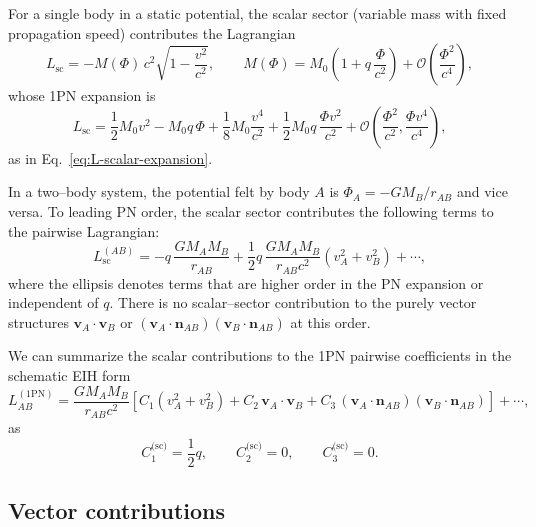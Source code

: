 \documentclass[11pt]{article}
\begin{document}
For a single body in a static potential, the scalar sector (variable mass
with fixed propagation speed) contributes the Lagrangian
\begin{equation}
  L_{\text{sc}}
  = -M(\Phi)\,c^2 \sqrt{1 - \frac{v^2}{c^2}},
  \qquad
  M(\Phi) = M_0 \left( 1 + q\,\frac{\Phi}{c^2} \right)
  + \mathcal{O}\!\left( \frac{\Phi^2}{c^4} \right),
\end{equation}
whose 1PN expansion is
\begin{equation}
  L_{\text{sc}}
  = \frac{1}{2} M_0 v^2
    - M_0 q\,\Phi
    + \frac{1}{8} M_0 \frac{v^4}{c^2}
    + \frac{1}{2} M_0 q\,\frac{\Phi v^2}{c^2}
    + \mathcal{O}\!\left( \frac{\Phi^2}{c^2}, \frac{\Phi v^4}{c^4} \right),
\end{equation}
as in Eq.~\eqref{eq:L-scalar-expansion}.

In a two--body system, the potential felt by body \(A\) is
\(\Phi_A = -G M_B / r_{AB}\) and vice versa.  To leading PN order, the
scalar sector contributes the following terms to the pairwise Lagrangian:
\begin{equation}
  L_{\text{sc}}^{(AB)}
  = - q \,\frac{G M_A M_B}{r_{AB}}
    + \frac{1}{2} q \,\frac{G M_A M_B}{r_{AB} c^2}
      \left( v_A^2 + v_B^2 \right)
    + \cdots,
  \label{eq:L-sc-AB}
\end{equation}
where the ellipsis denotes terms that are higher order in the PN expansion
or independent of \(q\).  There is no scalar--sector contribution to the
purely vector structures \(\mathbf{v}_A \cdot \mathbf{v}_B\) or
\((\mathbf{v}_A \cdot \mathbf{n}_{AB})
 (\mathbf{v}_B \cdot \mathbf{n}_{AB})\) at this order.

We can summarize the scalar contributions to the 1PN pairwise coefficients
in the schematic EIH form
\begin{equation}
  L_{AB}^{(1\text{PN})}
  = \frac{G M_A M_B}{r_{AB} c^2}
    \left[
      C_{1} (v_A^2 + v_B^2)
      + C_{2} \,\mathbf{v}_A \cdot \mathbf{v}_B
      + C_{3} \,
        (\mathbf{v}_A \cdot \mathbf{n}_{AB})
        (\mathbf{v}_B \cdot \mathbf{n}_{AB})
    \right] + \cdots,
  \label{eq:L-AB-coeffs-template}
\end{equation}
as
\begin{equation}
  C_{1}^{\text{(sc)}} = \frac{1}{2} q,
  \qquad
  C_{2}^{\text{(sc)}} = 0,
  \qquad
  C_{3}^{\text{(sc)}} = 0.
  \label{eq:C-sc}
\end{equation}

\subsection{Vector contributions}
\label{app:vector-contributions}
\end{document}
